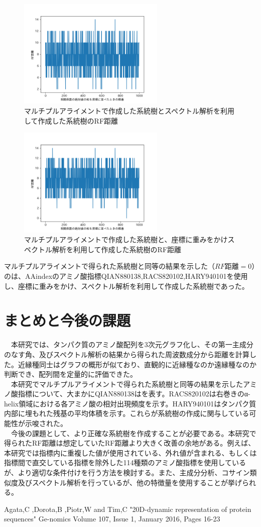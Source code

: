 \documentclass[twocolumn,paper=a4paper,landscape,fontsize=9pt]{jlreq}
\begin{document}
\begin{figure}[H]
  \centering
  \includegraphics[width=70mm]{f_treelist.png}
  \caption{マルチプルアライメントで作成した系統樹とスペクトル解析を利用して作成した系統樹のRF距離}
\end{figure}

\begin{figure}[H]
  \centering
  \includegraphics[width=70mm]{f_treelist_o.png}
  \caption{マルチプルアライメントで作成した系統樹と、座標に重みをかけスペクトル解析を利用して作成した系統樹のRF距離}
\end{figure}

マルチプルアライメントで得られた系統樹と同等の結果を示した（$RF距離=0$）のは、AAindexのアミノ酸指標QIAN880138,RACS820102,HARY940101を使用し、座標に重みをかけ、スペクトル解析を利用して作成した系統樹であった。


\section{まとめと今後の課題}
　本研究では、タンパク質のアミノ酸配列を3次元グラフ化し、その第一主成分のなす角、及びスペクトル解析の結果から得られた周波数成分から距離を計算した。近縁種同士はグラフの概形が似ており、直観的に近縁種なのか遠縁種なのか判断でき、配列間を定量的に評価できた。\\
　本研究でマルチプルアライメントで得られた系統樹と同等の結果を示したアミノ酸指標について、大まかにQIAN880138はを表す。RACS820102は右巻きのα-helix領域における各アミノ酸の相対出現頻度を示す。HARY940101はタンパク質内部に埋もれた残基の平均体積を示す。これらが系統樹の作成に関与している可能性が示唆された。\\
　今後の課題として、より正確な系統樹を作成することが必要である。本研究で得られたRF距離は想定していたRF距離より大きく改善の余地がある。例えば、本研究では指標内に重複した値が使用されている、外れ値が含まれる、もしくは指標間で直交している指標を除外した114種類のアミノ酸指標を使用しているが、より適切な条件付けを行う方法を検討する。また、主成分分析、コサイン類似度及びスペクトル解析を行っているが、他の特徴量を使用することが挙げられる。

\begin{thebibliography}{9}
   Agata,C ,Dorota,B ,Piotr,W and Tim,C "20D-dynamic representation of protein sequences" Ge-nomics Volume 107, Issue 1, January 2016, Pages 16-23
\end{thebibliography}
\end{document}
